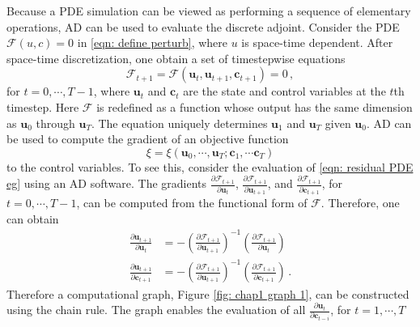 Because a PDE simulation can be viewed as 
performing a sequence of elementary operations, 
AD can be used to evaluate the discrete adjoint. Consider the PDE 
$\mathcal{F}(u,c)=0$ in \eqref{eqn: define perturb}, where $u$ is space-time dependent.
After space-time discretization, one obtain a set of timestepwise equations
\begin{equation}
    \mathcal{F}_{t+1} = \mathcal{F}(\boldsymbol{u}_t, \boldsymbol{u}_{t+1}, \boldsymbol{c}_{t+1})=0\,,
    \label{eqn: residual PDE eg}
\end{equation}
for $t=0, \cdots, T-1$, where $\boldsymbol{u}_t$ and $\boldsymbol{c}_t$ are
the state and control variables at the $t$th timestep. Here $\mathcal{F}$ is redefined as 
a function whose output has the same dimension as $\boldsymbol{u}_0$ through $\boldsymbol{u}_T$.
The equation uniquely determines $\boldsymbol{u}_1$ and $\boldsymbol{u}_T$ given $\boldsymbol{u}_0$. 
AD can be used to compute the gradient of an objective function
$$\xi = \xi(\boldsymbol{u}_0 , \cdots, \boldsymbol{u}_T; \boldsymbol{c}_1, \cdots 
\boldsymbol{c}_{T})$$ 
to the control variables.
To see this, consider the evaluation of \eqref{eqn: residual PDE eg} using an AD software. 
The gradients $\frac{\partial \mathcal{F}_{t+1}}{\partial \boldsymbol{u}_t}$, 
$\frac{\partial \mathcal{F}_{t+1}}{\partial \boldsymbol{u}_{t+1}}$, and
$\frac{\partial \mathcal{F}_{t+1}}{\partial \boldsymbol{c}_{t+1}}$, for
$t=0, \cdots, T-1$, can be computed from the functional form of $\mathcal{F}$. Therefore, one can obtain
\begin{equation}
    \begin{split}
        \frac{\partial \boldsymbol{u}_{t+1}}{\partial \boldsymbol{u}_t} &=
        - \left(\frac{\partial \mathcal{F}_{t+1}}{\partial \boldsymbol{u}_{t+1}}\right)^{-1}
        \left(\frac{\partial \mathcal{F}_{t+1}}{\partial \boldsymbol{u}_t}\right)\\
        \frac{\partial \boldsymbol{u}_{t+1}}{\partial \boldsymbol{c}_{t+1}} &=
        -\left(\frac{\partial \mathcal{F}_{t+1}}{\partial \boldsymbol{u}_{t+1}}\right)^{-1}
        \left(\frac{\partial \mathcal{F}_{t+1}}{\partial\boldsymbol{c}_{t+1}}\right)\,.
    \end{split}
    \label{eqn: elements for markov graph}
\end{equation}
Therefore a computational graph, Figure \ref{fig: chap1 graph 1},
can be constructed using the chain rule. The graph enables the evaluation of all
$\frac{\partial \boldsymbol{u}_t}{\partial \boldsymbol{c}_{t-i}}$, for $t=1, \cdots, T$
